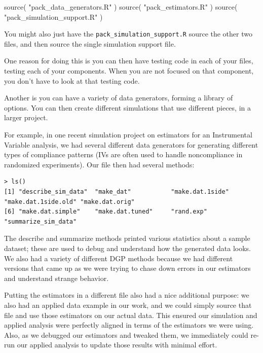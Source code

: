 \documentclass[
]{book}
\newenvironment{Shaded}{\begin{snugshade}}{\end{snugshade}}
\newcommand{\FunctionTok}[1]{\textcolor[rgb]{0.00,0.00,0.00}{#1}}
\newcommand{\NormalTok}[1]{#1}
\newcommand{\StringTok}[1]{\textcolor[rgb]{0.31,0.60,0.02}{#1}}
\begin{document}
\begin{Shaded}
\begin{Highlighting}[]
\FunctionTok{source}\NormalTok{( }\StringTok{"pack\_data\_generators.R"}\NormalTok{ )}
\FunctionTok{source}\NormalTok{( }\StringTok{"pack\_estimators.R"}\NormalTok{ )}
\FunctionTok{source}\NormalTok{( }\StringTok{"pack\_simulation\_support.R"}\NormalTok{ )}
\end{Highlighting}
\end{Shaded}

You might also just have the \texttt{pack\_simulation\_support.R} source the other two files, and then source the single simulation support file.

One reason for doing this is you can then have testing code in each of your files, testing each of your components.
When you are not focused on that component, you don't have to look at that testing code.

Another is you can have a variety of data generators, forming a library of options.
You can then create different simulations that use different pieces, in a larger project.

For example, in one recent simulation project on estimators for an Instrumental Variable analysis, we had several different data generators for generating different types of compliance patterns (IVs are often used to handle noncompliance in randomized experiments).
Our file then had several methods:

\begin{verbatim}
> ls()
[1] "describe_sim_data"  "make_dat"           "make.dat.1side"     "make.dat.1side.old" "make.dat.orig"     
[6] "make.dat.simple"    "make.dat.tuned"     "rand.exp"           "summarize_sim_data"
\end{verbatim}

The describe and summarize methods printed various statistics about a sample dataset; these are used to debug and understand how the generated data looks.
We also had a variety of different DGP methods because we had different versions that came up as we were trying to chase down errors in our estimators and understand strange behavior.

Putting the estimators in a different file also had a nice additional purpose: we also had an applied data example in our work, and we could simply source that file and use those estimators on our actual data.
This ensured our simulation and applied analysis were perfectly aligned in terms of the estimators we were using.
Also, as we debugged our estimators and tweaked them, we immediately could re-run our applied analysis to update those results with minimal effort.
\end{document}
